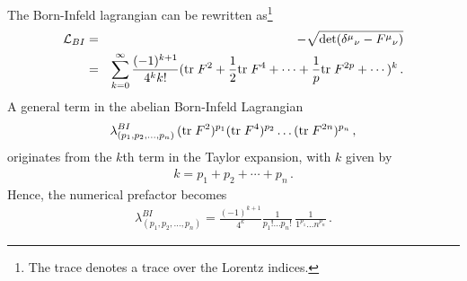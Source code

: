 \documentclass[a4paper,12pt,oneside]{article}
\newcommand{\tr}{\mbox{${\rm tr \;}$}}
\begin{document}
The Born-Infeld lagrangian can be rewritten as\footnote{The trace denotes 
a trace over the Lorentz indices.}
\begin{eqnarray}
{\cal L}_{BI}&=&-\sqrt{\det(\delta^\mu {}_\nu-F^\mu {}_\nu)}\nonumber\\
&=&\sum_{k=0}^{\infty} \frac{(-1)^{k+1}}{4^k k!} (\tr F^2 + 
\frac{1}{2}\tr F^4 + \cdots +
           \frac{1}{p} \tr F^{2p} + \cdots )^k \, .
\end{eqnarray}
A general term in the abelian Born-Infeld Lagrangian
\begin{eqnarray}
\lambda_{(p_1,p_2,\ldots,p_n)}^{BI} \, (\tr F^2)^{p_1} (\tr F^4)^{p_2} 
\ldots (\tr F^{2n})^{p_n} \, ,
\end{eqnarray}
originates from the $k$th term in the Taylor expansion, 
with $k$ given by
\begin{eqnarray}
k=p_1 + p_2 + \cdots + p_n \, .
\end{eqnarray}
Hence, the numerical prefactor becomes
\begin{eqnarray}
\label{BIfactors}
\lambda_{(p_1,p_2,\ldots,p_n)}^{BI}=\frac{(-1)^{k+1}}{4^k} 
\frac{1}{p_1 ! \ldots p_n !} \, \frac{1}{1^{p_1} \ldots n^{p_n}} \, .
\end{eqnarray}
\end{document}
